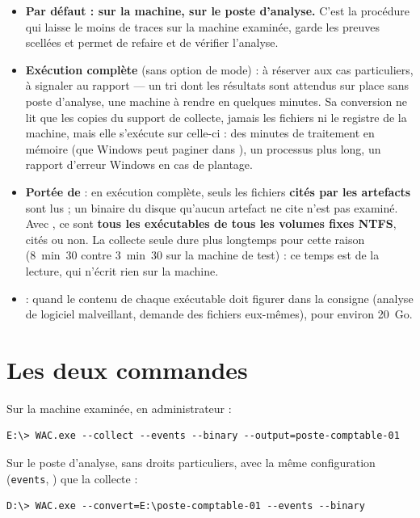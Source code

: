 \documentclass[11pt,a4paper,oneside]{report}
\begin{document}
\begin{itemize}
  \item \textbf{Par défaut :  sur la machine,  sur le
        poste d'analyse.} C'est la procédure qui laisse le moins de traces sur la
        machine examinée, garde les preuves scellées et permet de refaire et de
        vérifier l'analyse.
  \item \textbf{Exécution complète} (sans option de mode) : à réserver aux cas
        particuliers, à signaler au rapport — un tri dont les résultats sont
        attendus sur place sans poste d'analyse, une machine à rendre en quelques
        minutes. Sa conversion ne lit que les copies du support de collecte,
        jamais les fichiers ni le registre de la machine, mais elle s'exécute sur
        celle-ci : des minutes de traitement en mémoire (que Windows peut paginer
        dans ), un processus plus long, un rapport
        d'erreur Windows en cas de plantage.
  \item \textbf{Portée de } : en exécution complète, seuls les
        fichiers \textbf{cités par les artefacts} sont lus ; un binaire du disque
        qu'aucun artefact ne cite n'est pas examiné. Avec , ce sont
        \textbf{tous les exécutables de tous les volumes fixes NTFS}, cités ou non.
        La collecte seule dure plus longtemps pour cette raison (8~min~30
        contre 3~min~30 sur la machine de test) : ce temps est de la lecture,
        qui n'écrit rien sur la machine.
  \item \textbf{} : quand le contenu de chaque exécutable doit
        figurer dans la consigne (analyse de logiciel malveillant, demande des
        fichiers eux-mêmes), pour environ 20~Go.
\end{itemize}

\section{Les deux commandes}

Sur la machine examinée, en administrateur :
\begin{lstlisting}
E:\> WAC.exe --collect --events --binary --output=poste-comptable-01
\end{lstlisting}

Sur le poste d'analyse, sans droits particuliers, avec la même configuration
(\texttt{events}, ) que la collecte :
\begin{lstlisting}
D:\> WAC.exe --convert=E:\poste-comptable-01 --events --binary
\end{lstlisting}
\end{document}
